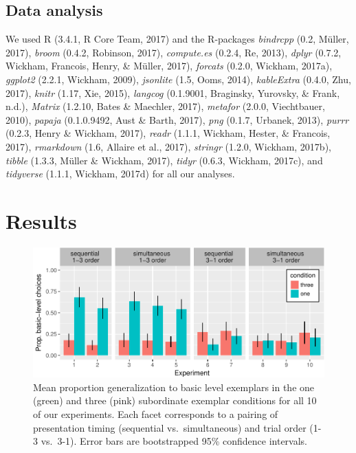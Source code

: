 \documentclass[english,floatsintext,man]{apa6}
\theoremstyle{definition}
\theoremstyle{definition}
\theoremstyle{remark}
\begin{document}
\subsection{Data analysis}\label{data-analysis}

We used R (3.4.1, R Core Team, 2017) and the R-packages \emph{bindrcpp}
(0.2, Müller, 2017), \emph{broom} (0.4.2, Robinson, 2017),
\emph{compute.es} (0.2.4, Re, 2013), \emph{dplyr} (0.7.2, Wickham,
Francois, Henry, \& Müller, 2017), \emph{forcats} (0.2.0, Wickham,
2017a), \emph{ggplot2} (2.2.1, Wickham, 2009), \emph{jsonlite} (1.5,
Ooms, 2014), \emph{kableExtra} (0.4.0, Zhu, 2017), \emph{knitr} (1.17,
Xie, 2015), \emph{langcog} (0.1.9001, Braginsky, Yurovsky, \& Frank,
n.d.), \emph{Matrix} (1.2.10, Bates \& Maechler, 2017), \emph{metafor}
(2.0.0, Viechtbauer, 2010), \emph{papaja} (0.1.0.9492, Aust \& Barth,
2017), \emph{png} (0.1.7, Urbanek, 2013), \emph{purrr} (0.2.3, Henry \&
Wickham, 2017), \emph{readr} (1.1.1, Wickham, Hester, \& Francois,
2017), \emph{rmarkdown} (1.6, Allaire et al., 2017), \emph{stringr}
(1.2.0, Wickham, 2017b), \emph{tibble} (1.3.3, Müller \& Wickham, 2017),
\emph{tidyr} (0.6.3, Wickham, 2017c), and \emph{tidyverse} (1.1.1,
Wickham, 2017d) for all our analyses.

\section{Results}\label{results}

\begin{figure}
\centering
\includegraphics{xtmem_files/figure-latex/unnamed-chunk-2-1.pdf}
\caption{\label{fig:unnamed-chunk-2}Mean proportion generalization to basic
level exemplars in the one (green) and three (pink) subordinate exemplar
conditions for all 10 of our experiments. Each facet corresponds to a
pairing of presentation timing (sequential vs.~simultaneous) and trial
order (1-3 vs.~3-1). Error bars are bootstrapped 95\% confidence
intervals.}
\end{figure}
\end{document}
